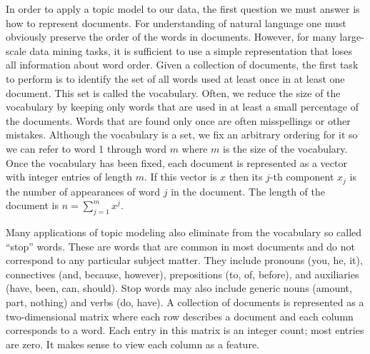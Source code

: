 \documentclass[12pt]{report}
\begin{document}
In order to apply a topic model to our data, the first question we must answer
is how to represent documents. For understanding of natural language one must
obviously preserve the order of the words in documents. However, for many
large-scale data mining tasks, it is sufficient to use a simple representation
that loses all information about word order. Given a collection of documents,
the first task to perform is to identify the set of all words used at least
once in at least one document. This set is called the vocabulary. Often, we
reduce the size of the vocabulary by keeping only words that are used in at
least a small percentage of the documents. Words that are found only once are
often misspellings or other mistakes. Although the vocabulary is a set, we fix
an arbitrary ordering for it so we can refer to word 1 through word $m$ where
$m$ is the size of the vocabulary. Once the vocabulary has been fixed, each
document is represented as a vector with integer entries of length $m$. If this
vector is $x$ then its $j$-th component $x_j$ is the number of appearances of
word $j$ in the document. The length of the document is $n=\sum\limits_{j=1}^m
x^j$.

Many applications of topic modeling also eliminate from the vocabulary so
called “stop” words. These are words that are common in most documents and do
not correspond to any particular subject matter. They include pronouns (you,
he, it), connectives (and, because, however), prepositions (to, of, before),
and auxiliaries (have, been, can, should). Stop words may also include generic
nouns (amount, part, nothing) and verbs (do, have). A collection of documents
is represented as a two-dimensional matrix where each row describes a document
and each column corresponds to a word. Each entry in this matrix is an integer
count; most entries are zero. It makes sense to view each column as a feature.
\end{document}
